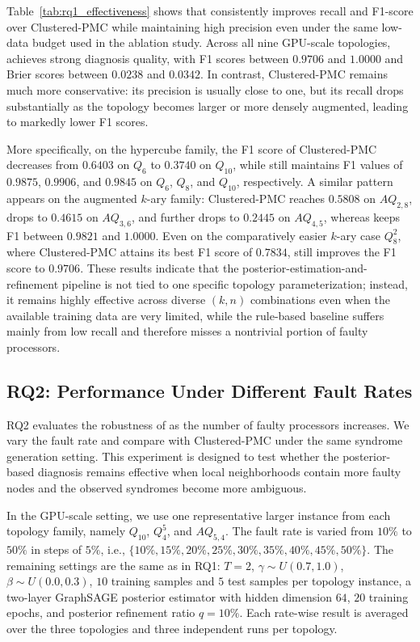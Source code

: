 Table~\ref{tab:rq1_effectiveness} shows that \tool consistently improves recall and F1-score over Clustered-PMC while maintaining high precision even under the same low-data budget used in the ablation study. Across all nine GPU-scale topologies, \tool achieves strong diagnosis quality, with F1 scores between $0.9706$ and $1.0000$ and Brier scores between $0.0238$ and $0.0342$. In contrast, Clustered-PMC remains much more conservative: its precision is usually close to one, but its recall drops substantially as the topology becomes larger or more densely augmented, leading to markedly lower F1 scores.

More specifically, on the hypercube family, the F1 score of Clustered-PMC decreases from $0.6403$ on $Q_6$ to $0.3740$ on $Q_{10}$, while \tool still maintains F1 values of $0.9875$, $0.9906$, and $0.9845$ on $Q_6$, $Q_8$, and $Q_{10}$, respectively. A similar pattern appears on the augmented $k$-ary family: Clustered-PMC reaches $0.5808$ on $AQ_{2,8}$, drops to $0.4615$ on $AQ_{3,6}$, and further drops to $0.2445$ on $AQ_{4,5}$, whereas \tool keeps F1 between $0.9821$ and $1.0000$. Even on the comparatively easier $k$-ary case $Q_8^2$, where Clustered-PMC attains its best F1 score of $0.7834$, \tool still improves the F1 score to $0.9706$. These results indicate that the posterior-estimation-and-refinement pipeline is not tied to one specific topology parameterization; instead, it remains highly effective across diverse $(k,n)$ combinations even when the available training data are very limited, while the rule-based baseline suffers mainly from low recall and therefore misses a nontrivial portion of faulty processors.

\subsection{RQ2: Performance Under Different Fault Rates}
\label{subsec:rq2_fault_rate}

RQ2 evaluates the robustness of \tool as the number of faulty processors increases. We vary the fault rate and compare \tool with Clustered-PMC under the same syndrome generation setting. This experiment is designed to test whether the posterior-based diagnosis remains effective when local neighborhoods contain more faulty nodes and the observed syndromes become more ambiguous.

In the GPU-scale setting, we use one representative larger instance from each topology family, namely $Q_{10}$, $Q_4^5$, and $AQ_{5,4}$. The fault rate is varied from $10\%$ to $50\%$ in steps of $5\%$, i.e., $\{10\%, 15\%, 20\%, 25\%, 30\%, 35\%, 40\%, 45\%, 50\%\}$. The remaining settings are the same as in RQ1: $T=2$, $\gamma \sim U(0.7, 1.0)$, $\beta \sim U(0.0, 0.3)$, $10$ training samples and $5$ test samples per topology instance, a two-layer GraphSAGE posterior estimator with hidden dimension $64$, $20$ training epochs, and posterior refinement ratio $q=10\%$. Each rate-wise result is averaged over the three topologies and three independent runs per topology.

